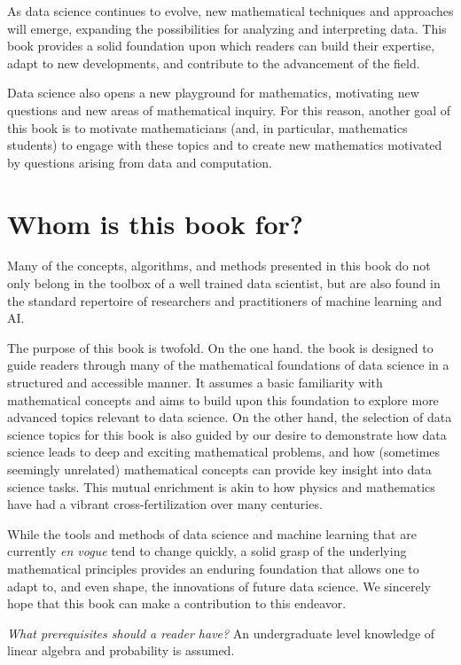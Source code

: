 As data science continues to evolve, new mathematical techniques and approaches will emerge, expanding the possibilities for analyzing and interpreting data. This book provides a solid foundation upon which readers can build their expertise, adapt to new developments, and contribute to the advancement of the field.


Data science also opens a new playground for mathematics, motivating new questions and new areas of mathematical inquiry. For this reason, another goal of this book is to motivate mathematicians (and, in particular, mathematics students) to engage with these topics and to create new mathematics motivated by questions arising from data and computation.


\section{Whom is this book for?}

Many of the concepts, algorithms, and methods presented in this book do not only belong in the toolbox of a well trained data scientist, but are also found in the standard repertoire of researchers and practitioners of machine learning and AI.

The purpose of this book is twofold.  On the one hand. the book is designed to guide readers through many of the mathematical foundations of data science in a structured and accessible manner. It assumes a basic familiarity with mathematical concepts and aims to build upon this foundation to explore more advanced topics relevant to data science.
On the other hand, the selection of data science topics for this book is also guided by our desire to demonstrate how data science leads to deep and exciting mathematical problems, and how (sometimes seemingly unrelated) mathematical concepts can provide key insight into data science tasks. This mutual enrichment is akin to how physics and mathematics have had a vibrant cross-fertilization over many centuries.

While the tools and methods of data science and machine learning that are currently {\em en vogue} tend to change quickly, a solid grasp of the underlying mathematical principles provides an enduring foundation that allows one to adapt to, and even shape, the innovations of  future data science. We sincerely hope that this book can make a contribution to this endeavor. 

\emph{What prerequisites should a reader have?}  An undergraduate level knowledge of linear algebra and probability is assumed.

